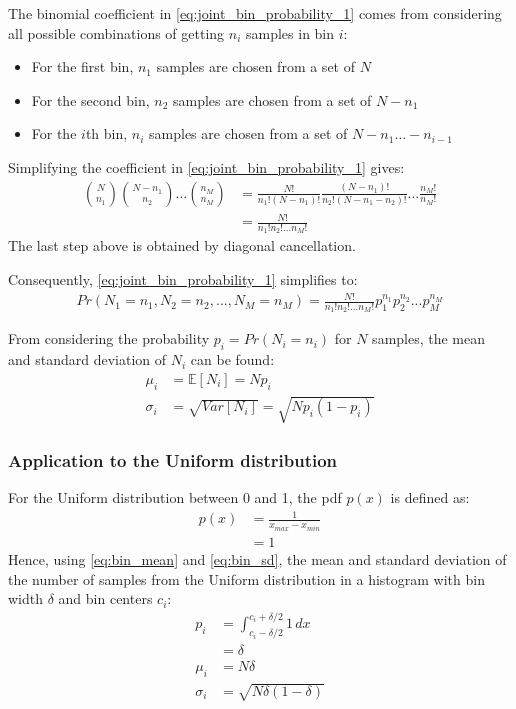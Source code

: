 \documentclass[a4paper]{article}
\begin{document}
The binomial coefficient in \autoref{eq:joint_bin_probability_1} comes from considering all possible combinations of
getting $n_i$ samples in bin $i$:
\begin{itemize}
    \item For the first bin, $n_1$ samples are chosen from a set of $N$
    \item For the second bin, $n_2$ samples are chosen from a set of $N - n_1$
    \item For the $i$th bin, $n_i$ samples are chosen from a set of $N - n_1 \dots - n_{i-1}$
\end{itemize}
Simplifying the coefficient in \autoref{eq:joint_bin_probability_1} gives:
\begin{align*}
    {N \choose n_1}{N - n_1 \choose n_2} \dots {n_M \choose n_M}
  & = \frac{N!}{n_1!(N - n_1)!} \frac{(N - n_1)!}{n_2!(N - n_1 - n_2)!} \dots \frac{n_M!}{n_M!} \\
  & = \frac{N!}{n_1! n_2! \dots n_M!}
\end{align*}
The last step above is obtained by diagonal cancellation.

Consequently, \autoref{eq:joint_bin_probability_1} simplifies to:
\begin{align*}
    Pr(N_1 = n_1, N_2 = n_2, \dots, N_M = n_M) = \frac{N!}{n_1! n_2! \dots n_M!} p_1^{n_1} p_2^{n_2} ... p_M^{n_M}
\end{align*}

From considering the probability $p_i = Pr(N_i = n_i)$ for $N$ samples, the mean and standard deviation of $N_i$ can be
found:
\begin{align}
    \label{eq:bin_mean}
    \mu_i &= \mathbb{E}[N_i] = N p_i \\
    \label{eq:bin_sd}
    \sigma_i &= \sqrt{Var[N_i]} = \sqrt{N p_i (1 - p_i)}
\end{align}


\subsubsection{Application to the Uniform distribution}
For the Uniform distribution between 0 and 1, the pdf $p(x)$ is defined as:
\begin{align*}
    p(x) &= \frac{1}{x_{max} - x_{min}} \\
         &= 1
\end{align*}
Hence, using \autoref{eq:bin_mean} and \autoref{eq:bin_sd}, the mean and standard deviation of the number of samples from the
Uniform distribution in a histogram with bin width $\delta$ and bin centers $c_i$:
\begin{align*}
    p_i &= \int_{c_i - \delta/2}^{c_i + \delta/2}1\,dx \\
        &= \delta \\
    \mu_i &= N \delta \\
    \sigma_i &= \sqrt{N \delta (1 - \delta)}
\end{align*}
\end{document}
